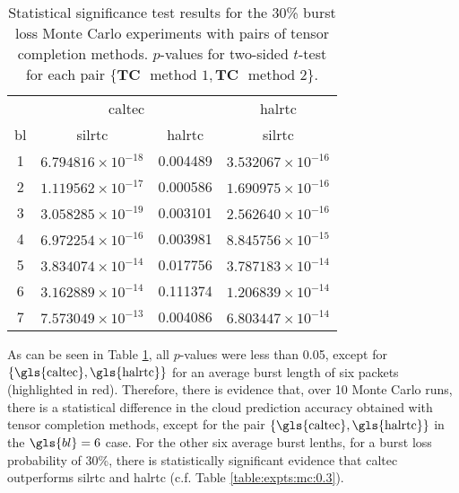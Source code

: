\begin{table}[H]
	\caption[Statistical significance results for the 30\% burst loss scenario with no tensor completion]{Statistical significance test results for the 30\% burst loss Monte Carlo experiments with pairs of tensor completion methods. $p$-values for two-sided $t$-test for each pair $\{\textbf{TC} \mbox{ } \text{method 1},\textbf{TC} \mbox{ } \text{method 2}\}$.} \label{table:expts:ttest:tc}
	\centering
	\begin{adjustbox}{max width = \textwidth}
		\begin{tabular}{|c|cc|c|}
			\hline
			\multicolumn{1}{|c|}{} &
			\multicolumn{2}{c|}{\gls{caltec}} & \multicolumn{1}{c|}{\gls{halrtc}} \\
			\gls{bl} &  \gls{silrtc} &  \gls{halrtc} &  \gls{silrtc} \\
			\hline \hline 
				1 &   $6.794816 \times 10^{-18}$ &       0.004489 &   $3.532067 \times 10^{-16}$ \\
				2 &   $1.119562 \times 10^{-17}$ &       0.000586 &   $1.690975 \times 10^{-16}$ \\
				3 &   $3.058285 \times 10^{-19}$ &       0.003101 &   $2.562640 \times 10^{-16}$ \\
				4 &   $6.972254 \times 10^{-16}$ &       0.003981 &   $8.845756 \times 10^{-15}$ \\
				5 &   $3.834074 \times 10^{-14}$ &       0.017756 &   $3.787183 \times 10^{-14}$ \\
				6 &   $3.162889 \times 10^{-14}$ &      \cellcolor{red!40} 0.111374 &   $1.206839 \times 10^{-14}$ \\
				7 &   $7.573049 \times 10^{-13}$ &       0.004086 &   $6.803447 \times 10^{-14}$ \\
				\hline
			\end{tabular}%
	\end{adjustbox}
\end{table}

As can be seen in Table \ref{table:expts:ttest:tc}, all $p$-values were less than 0.05, except for  $\{\text{\gls{caltec}},\text{\gls{halrtc}}\}$ for an average burst length of six packets (highlighted in red). Therefore, there is evidence that, over 10 Monte Carlo runs, there is a statistical difference in the cloud prediction accuracy obtained with tensor completion methods, except for the pair $\{\text{\gls{caltec}},\text{\gls{halrtc}}\}$ in the $\gls{bl}=6$ case. For the other six average burst lenths, for a burst loss probability of 30\%, there is statistically significant evidence that \gls{caltec} outperforms \gls{silrtc} and \gls{halrtc} (c.f. Table \ref{table:expts:mc:0.3}).

